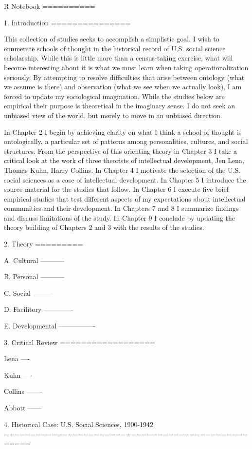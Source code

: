 R Notebook
==========

1. Introduction
===============

This collection of studies seeks to accomplish a simplistic goal. I wish
to enumerate schools of thought in the historical record of U.S. social
science scholarship. While this is little more than a census-taking
exercise, what will become interesting about it is what we must learn
when taking operationalization seriously. By attempting to resolve
difficulties that arise between ontology (what we assume is there) and
observation (what we see when we actually look), I am forced to update
my sociological imagination. While the studies below are empirical their
purpose is theoretical in the imaginary sense. I do not seek an unbiased
view of the world, but merely to move in an unbiased direction.

In Chapter 2 I begin by achieving clarity on what I think a school of
thought is ontologically, a particular set of patterns among
personalities, cultures, and social structures. From the perspective of
this orienting theory in Chapter 3 I take a critical look at the work of
three theorists of intellectual development, Jen Lena, Thomas Kuhn,
Harry Collins. In Chapter 4 I motivate the selection of the U.S. social
sciences as a case of intellectual development. In Chapter 5 I introduce
the source material for the studies that follow. In Chapter 6 I execute
five brief empirical studies that test different aspects of my
expectations about intellectual communities and their development. In
Chapters 7 and 8 I summarize findings and discuss limitations of the
study. In Chapter 9 I conclude by updating the theory building of
Chapters 2 and 3 with the results of the studies.

2. Theory
=========

A. Cultural
-----------

B. Personal
-----------

C. Social
---------

D. Facilitory
-------------

E. Developmental
----------------

3. Critical Review
==================

Lena
----

Kuhn
----

Collins
-------

Abbott
------

4. Historical Case: U.S. Social Sciences, 1900-1942
===================================================

